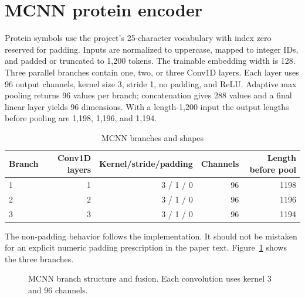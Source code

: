 \section{MCNN protein encoder}
Protein symbols use the project's 25-character vocabulary with index zero reserved for padding. Inputs are normalized to uppercase, mapped to integer IDs, and padded or truncated to 1,200 tokens. The trainable embedding width is 128. Three parallel branches contain one, two, or three Conv1D layers. Each layer uses 96 output channels, kernel size 3, stride 1, no padding, and ReLU. Adaptive max pooling returns 96 values per branch; concatenation gives 288 values and a final linear layer yields 96 dimensions. With a length-1,200 input the output lengths before pooling are 1,198, 1,196, and 1,194.
\begin{table}[H]\centering\caption{MCNN branches and shapes}\label{tab:mcnn}\begin{tabular}{lrrrr}\toprule Branch & Conv1D layers & Kernel/stride/padding & Channels & Length before pool\\\midrule 1 & 1 & 3 / 1 / 0 & 96 & 1198\\2 & 2 & 3 / 1 / 0 & 96 & 1196\\3 & 3 & 3 / 1 / 0 & 96 & 1194\\\bottomrule\end{tabular}\end{table}
The non-padding behavior follows the implementation. It should not be mistaken for an explicit numeric padding prescription in the paper text. Figure~\ref{fig:mcnn} shows the three branches.
\begin{figure}[H]\centering{}\caption{MCNN branch structure and fusion. Each convolution uses kernel 3 and 96 channels.}\label{fig:mcnn}\end{figure}

